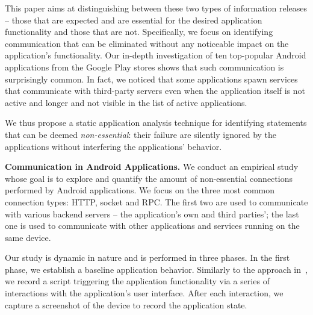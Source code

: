 This paper aims at distinguishing between these two types of information releases -- those that are expected and are essential for the desired application functionality and those that are not.  
Specifically, we focus on identifying communication that can be eliminated without any noticeable impact on the application's functionality. 
Our in-depth investigation of ten top-popular Android applications from the Google Play stores shows that such communication is surprisingly common.
In fact, we noticed that some applications spawn services that communicate with third-party servers even when the application itself is not active and longer and not visible in the list of active applications. 

 
We thus propose a static application analysis technique for identifying statements that can be deemed \emph{non-essential}: their failure are silently ignored by the applications
without interfering the applications' behavior. 

\vspace{0.1in}
\noindent 
{\bf Communication in Android Applications.}
We conduct an empirical study whose goal is to explore and quantify the amount of non-essential connections performed by Android applications. 
We focus on the three most common connection types: HTTP, socket and RPC.
The first two are used to communicate with various backend servers -- the application's own and third parties'; 
the last one is used to communicate with other applications and services running on the same device.

Our study is dynamic in nature and is performed in three phases. 
In the first phase, we establish a baseline application behavior. 
Similarly to the approach in~\cite{Hornyack:Han:Jung:Schechter:Wetherall:CCS11}, we record a script triggering the application functionality via a series of interactions with the application's user interface. 
After each interaction, we capture a screenshot of the device to record the application state. 

